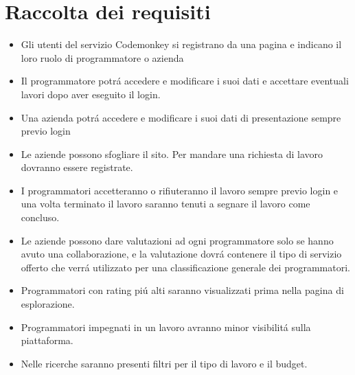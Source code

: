 \section {\Large Raccolta dei requisiti}
\begin{itemize}
\large
\item Gli utenti del servizio Codemonkey si registrano da una pagina e indicano il loro ruolo di programmatore o azienda
\item Il programmatore potrá accedere e modificare i suoi dati e accettare eventuali lavori dopo aver eseguito il login.
\item Una azienda potrá accedere e modificare i suoi dati di presentazione sempre previo login
\item Le aziende possono sfogliare il sito. Per mandare una richiesta di lavoro dovranno essere registrate.
\item I programmatori accetteranno o rifiuteranno il lavoro sempre previo login e una volta terminato il lavoro saranno tenuti a segnare il lavoro come concluso.
\item Le aziende possono dare valutazioni ad ogni programmatore solo se hanno avuto una collaborazione, e la valutazione dovrá contenere il tipo di servizio offerto che verrá utilizzato per una classificazione generale dei programmatori.
\item Programmatori con rating piú alti saranno visualizzati prima nella pagina di esplorazione.
\item Programmatori impegnati in un lavoro avranno minor visibilitá sulla piattaforma.
\item Nelle ricerche saranno presenti filtri per il tipo di lavoro e il budget.
\end{itemize}
